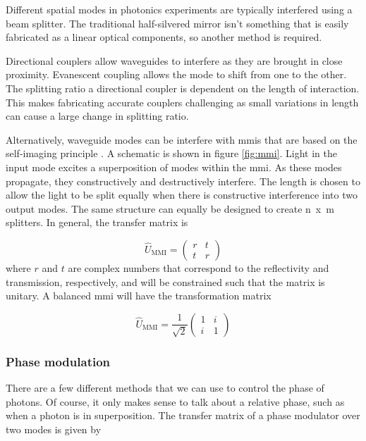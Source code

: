 Different spatial modes in photonics experiments are typically interfered using a beam splitter. The traditional half-silvered mirror isn't something that is easily fabricated as a linear optical components, so another method is required.

Directional couplers allow waveguides to interfere as they are brought in close proximity. Evanescent coupling allows the mode to shift from one to the other. The splitting ratio a directional coupler is dependent on the length of interaction. This makes fabricating accurate couplers challenging as small variations in length can cause a large change in splitting ratio.

Alternatively, waveguide modes can be interfere with \acp{mmi} that are based on the self-imaging principle \cite{soldano1995optical}. A schematic is shown in figure \ref{fig:mmi}. Light in the input mode excites a superposition of modes within the \ac{mmi}. As these modes propagate, they constructively and destructively interfere. The length is chosen to allow the light to be split equally when there is constructive interference into two output modes. The same structure can equally be designed to create \si{n x m} splitters. In general, the transfer matrix is

\begin{equation}
	\hat{U}_\mathrm{MMI} = \left(
	\begin{matrix}
	r & t\\
	t & r
	\end{matrix}
	\right)
\end{equation}
where $r$ and $t$ are complex numbers that correspond to the reflectivity and transmission, respectively, and will be constrained such that the matrix is unitary. A balanced \ac{mmi} will have the transformation matrix

\begin{equation}
	\hat{U}_\mathrm{MMI} = \frac{1}{\sqrt{2}}\left(
	\begin{matrix}
	1 & i\\
	i & 1
	\end{matrix}
	\right)
\end{equation}

\subsubsection*{Phase modulation}

There are a few different methods that we can use to control the phase of photons. Of course, it only makes sense to talk about a relative phase, such as when a photon is in superposition. The transfer matrix of a phase modulator over two modes is given by

